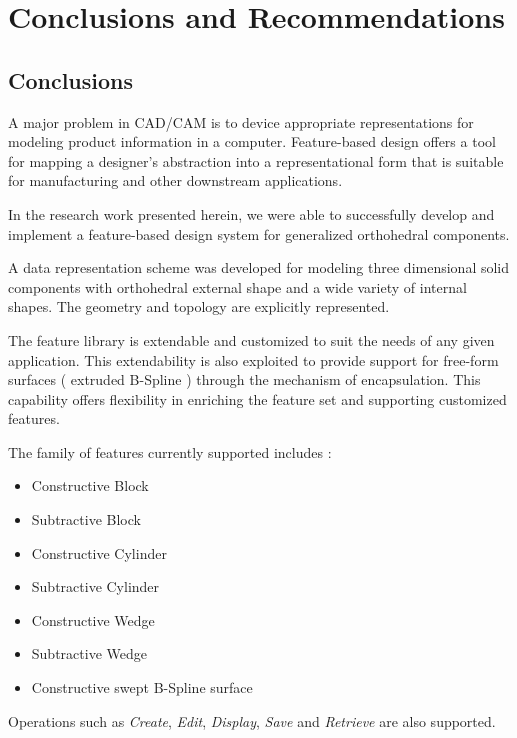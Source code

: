 \chapter{Conclusions and Recommendations}

	\section{Conclusions}

	A major problem in CAD/CAM is to device appropriate representations for
	modeling product information in a computer. Feature-based design offers a
	tool for mapping a designer's abstraction into a representational form
	that is suitable for manufacturing and other downstream applications.

	In the research work presented herein, we were able to successfully
	develop and implement a feature-based design system for generalized
	orthohedral components.

	A data representation scheme was developed for modeling three
	dimensional solid components with orthohedral external shape and a wide
	variety of internal shapes. 
	The geometry and topology are explicitly represented.

	The feature library is extendable and customized to suit the needs of 
	any given application. This extendability is also exploited to provide 
	support for free-form 
	surfaces ( extruded B-Spline ) through the mechanism of encapsulation.
	This capability offers flexibility in enriching the feature set and
	supporting customized features.


    The family of features currently supported includes :
        \begin{itemize}
        \item
        Constructive Block
        \item
        Subtractive Block
        \item
        Constructive Cylinder
        \item
        Subtractive Cylinder
        \item
        Constructive Wedge
        \item
        Subtractive Wedge
        \item
        Constructive swept B-Spline surface
        \end{itemize}


	Operations such as {\em Create}, {\em Edit}, {\em Display}, {\em Save} and
	{\em Retrieve} are also supported.


